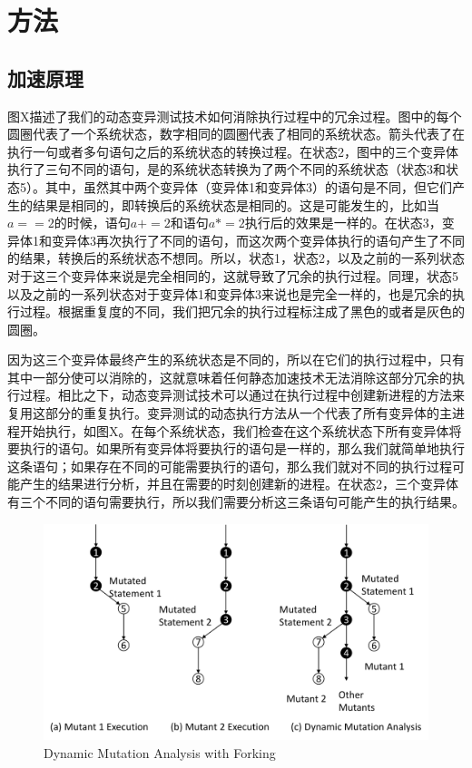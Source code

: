 \documentclass[nofonts]{ctexrep}
\begin{document}
\chapter{方法}
\section{加速原理}
图X描述了我们的动态变异测试技术如何消除执行过程中的冗余过程。图中的每个圆圈代表了一个系统状态，数字相同的圆圈代表了相同的系统状态。箭头代表了在执行一句或者多句语句之后的系统状态的转换过程。在状态2，图中的三个变异体执行了三句不同的语句，是的系统状态转换为了两个不同的系统状态（状态3和状态5）。其中，虽然其中两个变异体（变异体1和变异体3）的语句是不同，但它们产生的结果是相同的，即转换后的系统状态是相同的。这是可能发生的，比如当$a==2$的时候，语句$a+=2$和语句$a*=2$执行后的效果是一样的。在状态3，变异体1和变异体3再次执行了不同的语句，而这次两个变异体执行的语句产生了不同的结果，转换后的系统状态不想同。所以，状态1，状态2，以及之前的一系列状态对于这三个变异体来说是完全相同的，这就导致了冗余的执行过程。同理，状态5以及之前的一系列状态对于变异体1和变异体3来说也是完全一样的，也是冗余的执行过程。根据重复度的不同，我们把冗余的执行过程标注成了黑色的或者是灰色的圆圈。

因为这三个变异体最终产生的系统状态是不同的，所以在它们的执行过程中，只有其中一部分使可以消除的，这就意味着任何静态加速技术无法消除这部分冗余的执行过程。相比之下，动态变异测试技术可以通过在执行过程中创建新进程的方法来复用这部分的重复执行。变异测试的动态执行方法从一个代表了所有变异体的主进程开始执行，如图X。在每个系统状态，我们检查在这个系统状态下所有变异体将要执行的语句。如果所有变异体将要执行的语句是一样的，那么我们就简单地执行这条语句；如果存在不同的可能需要执行的语句，那么我们就对不同的执行过程可能产生的结果进行分析，并且在需要的时刻创建新的进程。在状态2，三个变异体有三个不同的语句需要执行，所以我们需要分析这三条语句可能产生的执行结果。

\begin{figure}[ht]
  \centering
  \includegraphics[width=\columnwidth]{figs/redundancy}
  \caption{Dynamic Mutation Analysis with Forking\label{fig:redundancy} }
\end{figure}
\end{document}
